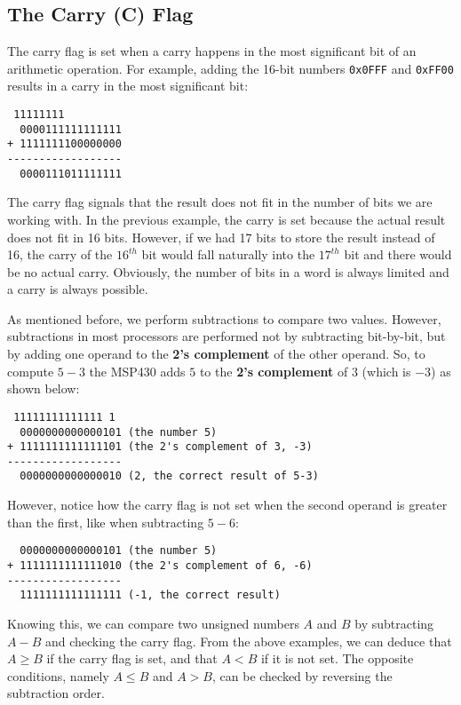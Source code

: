 \subsection{The Carry (C) Flag}\label{the-carry-c-flag}

The carry flag is set when a carry happens in the most significant bit
of an arithmetic operation. For example, adding the 16-bit numbers
\texttt{0x0FFF} and \texttt{0xFF00} results in a carry in the most
significant bit:

\begin{verbatim}
 11111111        
  0000111111111111
+ 1111111100000000
------------------
  0000111011111111
\end{verbatim}

The carry flag signals that the result does not fit in the number of
bits we are working with. In the previous example, the carry is set
because the actual result does not fit in 16 bits. However, if we had 17
bits to store the result instead of 16, the carry of the $16^{th}$ bit
would fall naturally into the $17^{th}$ bit and there would be no actual
carry. Obviously, the number of bits in a word is always limited and a
carry is always possible.

As mentioned before, we perform subtractions to compare two values.
However, subtractions in most processors are performed not by
subtracting bit-by-bit, but by adding one operand to the \textbf{2's
complement} of the other operand. So, to compute $5-3$ the MSP430 adds
$5$ to the \textbf{2's complement} of 3 (which is $-3$) as shown below:

\begin{verbatim}
 11111111111111 1 
  0000000000000101 (the number 5)
+ 1111111111111101 (the 2's complement of 3, -3)
------------------
  0000000000000010 (2, the correct result of 5-3)
\end{verbatim}

However, notice how the carry flag is not set when the second operand is
greater than the first, like when subtracting $5-6$:

\begin{verbatim}
  0000000000000101 (the number 5)
+ 1111111111111010 (the 2's complement of 6, -6)
------------------
  1111111111111111 (-1, the correct result) 
\end{verbatim}

Knowing this, we can compare two unsigned numbers $A$ and $B$ by
subtracting $A-B$ and checking the carry flag. From the above examples,
we can deduce that $A \geq B$ if the carry flag is set, and that $A < B$
if it is not set. The opposite conditions, namely $A \leq B$ and
$A > B$, can be checked by reversing the subtraction order.

